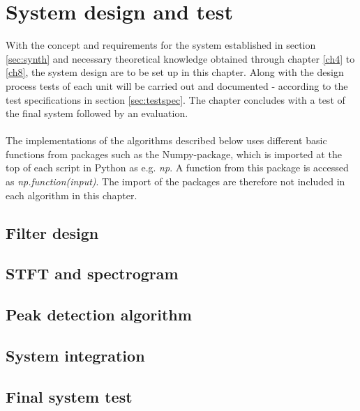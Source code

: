 \chapter{System design and test} \label{ch10}
With the concept and requirements for the system established in section \ref{sec:synth} and necessary theoretical knowledge obtained through chapter \ref{ch4} to \ref{ch8}, the system design are to be set up in this chapter. Along with the design process tests of each unit will be carried out and documented - according to the test specifications in section \ref{sec:testspec}. The chapter concludes with a test of the final system followed by an evaluation.
\\ \\
The implementations of the algorithms described below uses different basic functions from packages such as the Numpy-package, which is imported at the top of each script in Python as e.g. \textit{np}. A function from this package is accessed as \textit{np.function(input)}. The import of the packages are therefore not included in each algorithm in this chapter.



\section{Filter design}


\section{STFT and spectrogram}


\section{Peak detection algorithm}


\section{System integration}


\section{Final system test}


